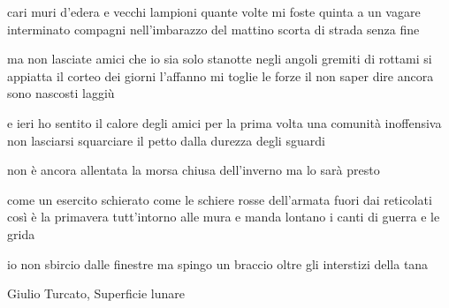 \clearpage


\begin{poem}
	\begin{stanza}
		cari muri d’edera e vecchi lampioni\verseline
		quante volte mi foste quinta\verseline
		a un vagare interminato\verseline
		compagni nell’imbarazzo del mattino\verseline
		scorta di strada senza fine
	\end{stanza}

	\begin{stanza}
		ma non lasciate amici\verseline
		che io sia solo stanotte\verseline
		negli angoli gremiti di rottami\verseline
		si appiatta il corteo dei giorni\verseline
		l’affanno mi toglie le forze\verseline
		il non saper dire\verseline
		ancora\verseline
		sono nascosti\verseline
		laggiù
	\end{stanza}

	\begin{stanza}
		e ieri ho sentito il calore degli amici\verseline
		per la prima volta una comunità\verseline
		inoffensiva\verseline
		non lasciarsi squarciare il petto\verseline
		dalla durezza degli sguardi
	\end{stanza}
\end{poem}

\clearpage


\begin{poem}
	\begin{stanza}
		non è ancora allentata\verseline
		la morsa chiusa dell'inverno\verseline
		ma lo sarà presto
	\end{stanza}

	\begin{stanza}
		come un esercito schierato\verseline
		come le schiere rosse dell'armata fuori dai reticolati\verseline
		così è la primavera tutt'intorno alle mura\verseline
		e manda lontano i canti di guerra e le grida
	\end{stanza}

	\begin{stanza}
		io non sbircio dalle finestre\verseline
		ma spingo un braccio oltre gli interstizi della tana
	\end{stanza}
\end{poem}

\clearpage


\begin{artItem}
	Giulio Turcato, Superficie lunare
\end{artItem}

